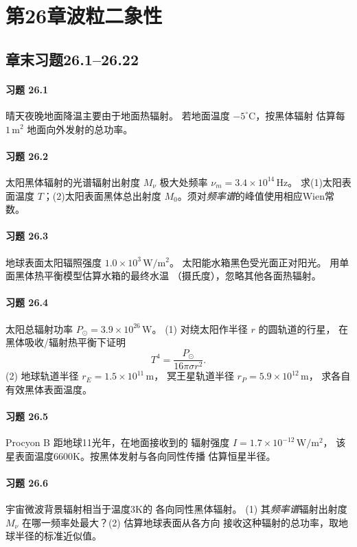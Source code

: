 \section*{第26章\quad 波粒二象性}
\subsection*{章末习题26.1--26.22}
\paragraph{习题 26.1}
晴天夜晚地面降温主要由于地面热辐射。
若地面温度 \(-5^\circ\mathrm C\)，按黑体辐射
估算每 \(1\,\mathrm{m^2}\) 地面向外发射的总功率。
\paragraph{习题 26.2}
太阳黑体辐射的光谱辐射出射度
\(M_\nu\) 极大处频率
\(\nu_m=3.4\times10^{14}\,\mathrm{Hz}\)。
求(1)太阳表面温度 \(T\)；(2)太阳表面黑体总出射度
\(M_0\)。须对\emph{频率谱}的峰值使用相应Wien常数。
\paragraph{习题 26.3}
地球表面太阳辐照强度
\(1.0\times10^3\,\mathrm{W/m^2}\)。
太阳能水箱黑色受光面正对阳光。
用单面黑体热平衡模型估算水箱的最终水温
（摄氏度），忽略其他各面热辐射。
\paragraph{习题 26.4}
太阳总辐射功率
\(P_\odot=3.9\times10^{26}\,\mathrm W\)。
(1) 对绕太阳作半径 \(r\) 的圆轨道的行星，
在黑体吸收/辐射热平衡下证明
\[
T^4=\frac{P_\odot}{16\pi\sigma r^2}.
\]
(2) 地球轨道半径
\(r_E=1.5\times10^{11}\,\mathrm m\)，
冥王星轨道半径
\(r_P=5.9\times10^{12}\,\mathrm m\)，
求各自有效黑体表面温度。
\paragraph{习题 26.5}
Procyon B 距地球11光年，在地面接收到的
辐射强度 \(I=1.7\times10^{-12}\,\mathrm{W/m^2}\)，
该星表面温度6600K。按黑体发射与各向同性传播
估算恒星半径。
\paragraph{习题 26.6}
宇宙微波背景辐射相当于温度3K的
各向同性黑体辐射。
(1) 其\emph{频率谱}辐射出射度 \(M_\nu\)
在哪一频率处最大？(2) 估算地球表面从各方向
接收这种辐射的总功率，取地球半径的标准近似值。

